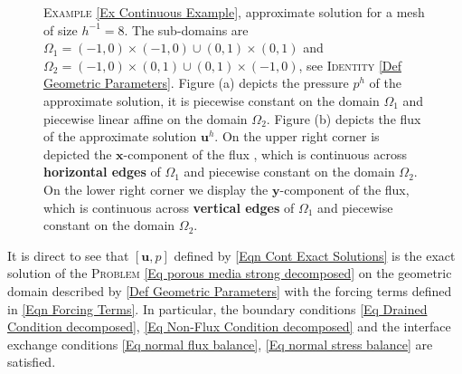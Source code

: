 \documentclass[3p]{elsarticle}
\def\u{\mathbf u}
\def\iversor{\widehat{\boldsymbol{\imath} } }
\def\jversor{\widehat{\boldsymbol{\jmath} } }
\begin{document}
\begin{example}
\begin{figure}[h]
	\caption{\textsc{Example} \ref{Ex Continuous Example}, approximate solution for a mesh of size $ h^{-1} = 8 $. The sub-domains are $\Omega_{1} = (-1, 0) \times (-1, 0)\cup  (0, 1) \times  (0, 1)$ and $\Omega_2 =  (-1, 0) \times (0, 1)\cup  (0, 1) \times  (-1, 0)$, see \textsc{Identity} \eqref{Def Geometric Parameters}.  Figure (a) depicts the pressure $p^{h}$ of the approximate solution, it is piecewise constant on the domain $\Omega_{1} $ and piecewise linear affine on the domain $\Omega_2$.
	Figure (b) depicts the flux of the approximate solution $\u^{h}$. On the upper right corner is depicted the $\boldsymbol{x}$-component of the flux %
	, which is continuous across \textbf{horizontal edges} of $\Omega_{1}$ and piecewise constant on the domain $\Omega_2$.	
	On the lower right corner we display %
	the $\boldsymbol{y}$-component of the flux, which is continuous across \textbf{vertical edges} of $\Omega_{1}$ and piecewise constant on the domain $\Omega_2$. \label{Fig Approximate Solution Numerical Example} }
\end{figure}
%
%
It is direct to see that $[\u, p]$ defined by \eqref{Eqn Cont Exact Solutions}
is the exact solution of the \textsc{Problem} \eqref{Eq porous media strong decomposed} on the geometric domain described by \eqref{Def Geometric Parameters} with the forcing terms defined in \eqref{Eqn Forcing Terms}. In particular, the boundary conditions \eqref{Eq Drained Condition decomposed}, \eqref{Eq Non-Flux Condition decomposed} and the interface exchange conditions \eqref{Eq normal flux balance}, \eqref{Eq normal stress balance} are satisfied.


\end{example}
\end{document}
